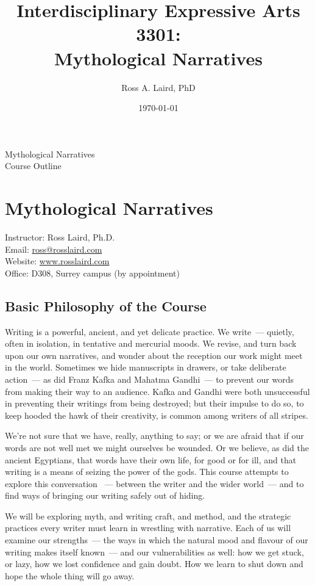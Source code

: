 \documentclass[letterpaper,10pt,headsepline]{scrreprt}
\author{Ross A. Laird, PhD}
\title{Interdisciplinary Expressive Arts 3301:\\Mythological Narratives}
\date{\today}
\begin{document}
\pagestyle{empty}
\vspace*{7em} 
\begin{center}
\huge{Mythological Narratives}\\
\vspace*{1em} 
\large{Course Outline}
\end{center}
\clearpage
\pagestyle{scrheadings}
\tableofcontents
\chapter{Mythological Narratives}
Instructor: Ross Laird, Ph.D.\\ 
Email: \url{ross@rosslaird.com}\\
Website: \url{www.rosslaird.com}\\
Office: D308, Surrey campus (by appointment)\\

\section{Basic Philosophy of the Course}
Writing is a powerful, ancient, and yet delicate practice. We write~--- quietly, often in isolation, in tentative and mercurial
moods. We revise, and turn back upon our own narratives, and wonder about the reception our work might meet in the world. Sometimes we hide manuscripts in drawers, or take deliberate action~--- as did Franz Kafka and Mahatma Gandhi~--- to prevent our words from making their way to an audience. Kafka and Gandhi were both unsuccessful in preventing their writings from being destroyed; but their impulse to do so, to keep hooded the hawk of their creativity, is common among writers of all stripes.

We're not sure that we have, really, anything to say; or we are afraid that if our words are not well met we might ourselves be wounded. Or we believe, as did the ancient Egyptians, that words have their own life, for good or for ill, and that writing is a means of seizing the power of the gods. This course attempts to explore this conversation ~--- between the writer and the wider world~--- and to find ways of bringing our writing safely out of hiding.

We will be exploring myth, and writing craft, and method, and the strategic practices every writer must learn in wrestling with narrative. Each of us will examine our strengths~--- the ways in which the natural mood and flavour of our writing makes itself known~--- and our vulnerabilities as well: how we get stuck, or lazy, how we lost confidence and gain doubt. How we learn to shut down and hope the whole thing will go away.
\end{document}
